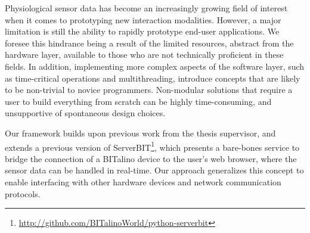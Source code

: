 Physiological sensor data has become an increasingly growing field of interest when it comes to prototyping new interaction modalities. However, a major limitation is still the ability to rapidly prototype end-user applications\cite{alves_signalbit:_2013}. We foresee this hindrance being a result of the limited resources, abstract from the hardware layer, available to those who are not technically proficient in these fields. In addition, implementing more complex aspects of the software layer, such as time-critical operations and multithreading, introduce concepts that are likely to be non-trivial to novice programmers. Non-modular solutions that require a user to build everything from scratch can be highly time-consuming, and unsupportive of spontaneous design choices.


Our framework builds upon previous work from the thesis supervisor, \citeauthor{da_silva_web-based_2012} \cite{da_silva_web-based_2012,da_silva_bit:_2014} and extends a previous version of ServerBIT\footnote[1]{\url{http://github.com/BITalinoWorld/python-serverbit}}, which presents a bare-bones service to bridge the connection of a BITalino device to the user's web browser, where the sensor data can be handled in real-time. Our approach generalizes this concept to enable interfacing with other hardware devices and network communication protocols.


